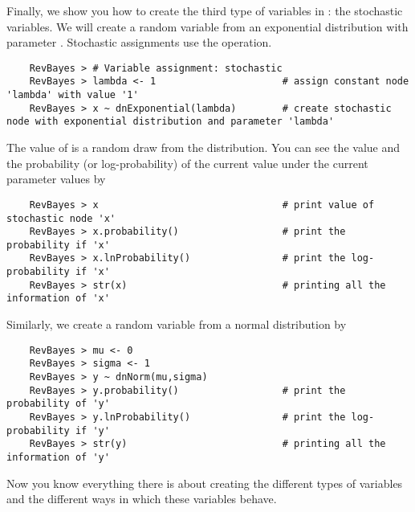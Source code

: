 Finally, we show you how to create the third type of variables in \Rev: the stochastic variables. 
We will create a random variable  from an exponential distribution with parameter .  
Stochastic assignments use the \cl{\rbdn} operation.
{\tt \begin{snugshade*}
\begin{lstlisting}    
    RevBayes > # Variable assignment: stochastic
    RevBayes > lambda <- 1                      # assign constant node 'lambda' with value '1'
    RevBayes > x ~ dnExponential(lambda)        # create stochastic node with exponential distribution and parameter 'lambda'
\end{lstlisting}
\end{snugshade*}}
The value of  is a random draw from the distribution. 
You can see the value and the probability (or log-probability) of the current value under the current parameter values by
{\tt \begin{snugshade*}
\begin{lstlisting}    
    RevBayes > x                                # print value of stochastic node 'x'
    RevBayes > x.probability()                  # print the probability if 'x'
    RevBayes > x.lnProbability()                # print the log-probability if 'x'
    RevBayes > str(x)                           # printing all the information of 'x'
\end{lstlisting}
\end{snugshade*}}
Similarly, we create a random variable  from a normal distribution by
{\tt \begin{snugshade*}
\begin{lstlisting}    
    RevBayes > mu <- 0
    RevBayes > sigma <- 1
    RevBayes > y ~ dnNorm(mu,sigma)	
    RevBayes > y.probability()                  # print the probability of 'y'
    RevBayes > y.lnProbability()                # print the log-probability if 'y'
    RevBayes > str(y)                           # printing all the information of 'y'
\end{lstlisting}
\end{snugshade*}}
Now you know everything there is about creating the different types of variables and the different ways in which these variables behave.



